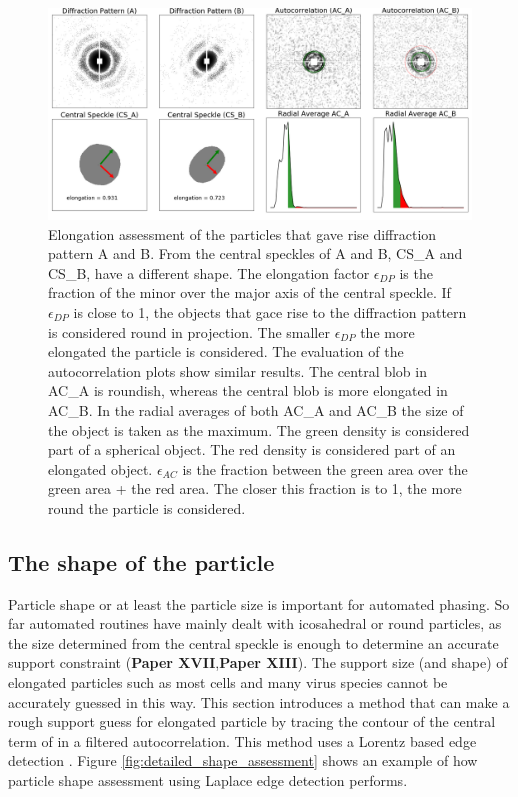 \begin{figure}[!h]
\centering
\includegraphics[width=120mm]{Chapter_08_ImageClassification_shape_assessment.png}
\caption{Elongation assessment of the particles that gave rise diffraction pattern A and B. From the central speckles of A and B, CS\_A and CS\_B, have a different shape. The elongation factor $\epsilon_{DP}$ is the fraction of the minor over the major axis of the central speckle. If $\epsilon_{DP}$ is close to 1, the objects that gace rise to the diffraction pattern is considered round in projection. The smaller $\epsilon_{DP}$ the more elongated the particle is considered. The evaluation of the autocorrelation plots show similar results. The central blob in AC\_A is roundish, whereas the central blob is more elongated in AC\_B. In the radial averages of both AC\_A and AC\_B the size of the object is taken as the maximum. The green density is considered part of a spherical object. The red density is considered part of an elongated object. $\epsilon_{AC}$ is the fraction between the green area over the green area + the red area. The closer this fraction is to 1, the more round the particle is considered.}\label{fig:shape_assessment}
\end{figure}


\subsection{The shape of the particle}
Particle shape or at least the particle size is important for automated phasing. So far automated routines have mainly dealt with icosahedral or round particles, as the size determined from the central speckle is enough to determine an accurate support constraint (\textbf{Paper XVII},\textbf{Paper XIII}). The support size (and shape) of elongated particles such as most cells and many virus species cannot be accurately guessed in this way. This section introduces a method that can make a rough support guess for elongated particle by tracing the contour of the central term of in a filtered autocorrelation. This method uses a Lorentz based edge detection \cite{Mathworks2018}.
Figure \ref{fig:detailed_shape_assessment} shows an example of how particle shape assessment using Laplace edge detection performs.

